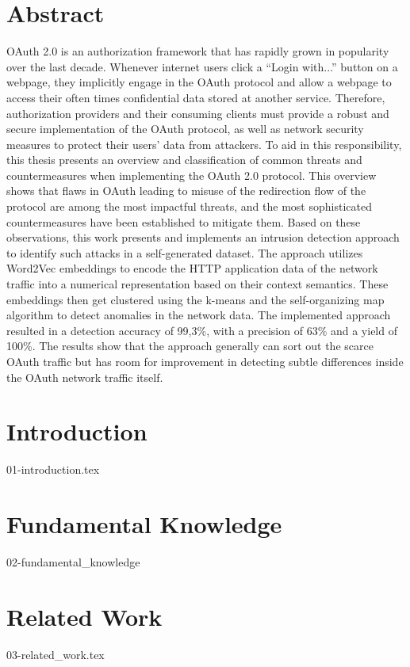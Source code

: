 \documentclass[
    fontsize=12pt,
    headings=small,
    parskip=half,           %
    bibliography=totoc,
    numbers=noenddot,       %
    open=any,               %
	final                   %
    ]{scrreprt}
\begin{document}
\chapter*{Abstract}
OAuth 2.0 is an authorization framework that has rapidly grown in popularity over the last decade. Whenever internet users click a ``Login with...'' button on a webpage, they implicitly engage in the OAuth protocol and allow a webpage to access their often times confidential data stored at another service. Therefore, authorization providers and their consuming clients must provide a robust and secure implementation of the OAuth protocol, as well as network security measures to protect their users' data from attackers. To aid in this responsibility, this thesis presents an overview and classification of common threats and countermeasures when implementing the OAuth 2.0 protocol. This overview shows that flaws in OAuth leading to misuse of the redirection flow of the protocol are among the most impactful threats, and the most sophisticated countermeasures have been established to mitigate them. Based on these observations, this work presents and implements an intrusion detection approach to identify such attacks in a self-generated dataset. The approach utilizes Word2Vec embeddings to encode the HTTP application data of the network traffic into a numerical representation based on their context semantics. These embeddings then get clustered using the k-means and the self-organizing map algorithm to detect anomalies in the network data. The implemented approach resulted in a detection accuracy of 99,3\%, with a precision of 63\% and a yield of 100\%. The results show that the approach generally can sort out the scarce OAuth traffic but has room for improvement in detecting subtle differences inside the OAuth network traffic itself.

\tableofcontents

\chapter{Introduction}
\label{chap:introduction}
{01-introduction.tex}

\chapter{Fundamental Knowledge}
\label{chap:fundamental_knowledge}
{02-fundamental_knowledge}

\chapter{Related Work}
\label{chap:related_work}
{03-related_work.tex}
\end{document}
